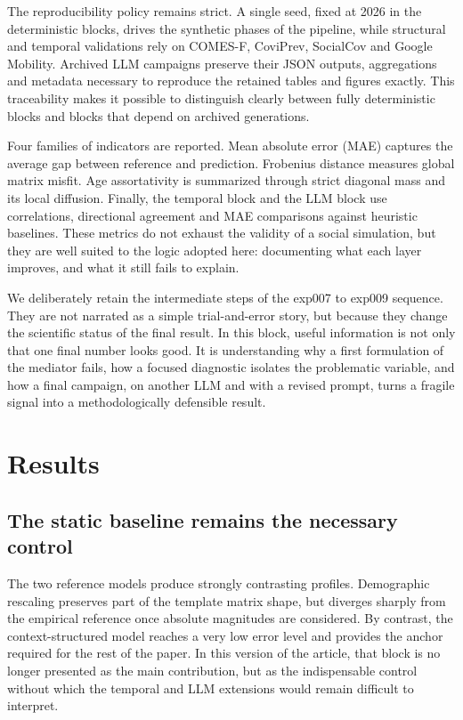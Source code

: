 \documentclass[ROIA,Unicode]{cedram}
\begin{document}
The reproducibility policy remains strict. A single seed, fixed at 2026 in the deterministic blocks, drives the synthetic phases of the pipeline, while structural and temporal validations rely on COMES-F, CoviPrev, SocialCov and Google Mobility. Archived LLM campaigns preserve their JSON outputs, aggregations and metadata necessary to reproduce the retained tables and figures exactly. This traceability makes it possible to distinguish clearly between fully deterministic blocks and blocks that depend on archived generations.

Four families of indicators are reported. Mean absolute error (MAE) captures the average gap between reference and prediction. Frobenius distance measures global matrix misfit. Age assortativity is summarized through strict diagonal mass and its local diffusion. Finally, the temporal block and the LLM block use correlations, directional agreement and MAE comparisons against heuristic baselines. These metrics do not exhaust the validity of a social simulation, but they are well suited to the logic adopted here: documenting what each layer improves, and what it still fails to explain.

We deliberately retain the intermediate steps of the exp007 to exp009 sequence. They are not narrated as a simple trial-and-error story, but because they change the scientific status of the final result. In this block, useful information is not only that one final number looks good. It is understanding why a first formulation of the mediator fails, how a focused diagnostic isolates the problematic variable, and how a final campaign, on another LLM and with a revised prompt, turns a fragile signal into a methodologically defensible result.

\section{Results}
\subsection{The static baseline remains the necessary control}
The two reference models produce strongly contrasting profiles. Demographic rescaling preserves part of the template matrix shape, but diverges sharply from the empirical reference once absolute magnitudes are considered. By contrast, the context-structured model reaches a very low error level and provides the anchor required for the rest of the paper. In this version of the article, that block is no longer presented as the main contribution, but as the indispensable control without which the temporal and LLM extensions would remain difficult to interpret.
\end{document}
